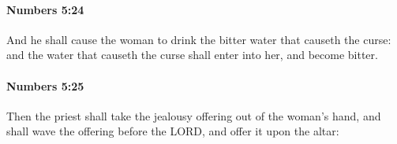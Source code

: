 		\paragraph{Numbers 5:24} %
			\label{NUMBERS-5-24}

			And he shall cause the woman to drink the bitter water that causeth the curse: and the water that causeth the curse shall enter into her, and become bitter.


		\paragraph{Numbers 5:25} %
			\label{NUMBERS-5-25}

			Then the priest shall take the jealousy offering out of the woman’s hand, and shall wave the offering before the LORD, and offer it upon the altar:


